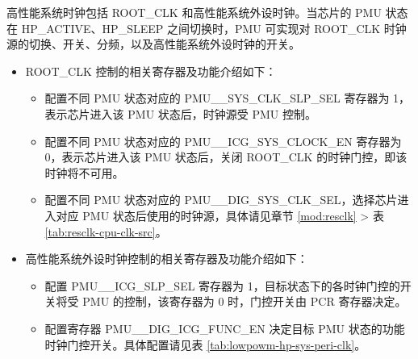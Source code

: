 \documentclass[main\_\_CN.tex]{subfiles}
\begin{document}
高性能系统时钟包括 ROOT\_CLK 和高性能系统外设时钟。当芯片的 PMU 状态在 HP\_ACTIVE、HP\_SLEEP 之间切换时，PMU 可实现对 ROOT\_CLK 时钟源的切换、开关、分频，以及高性能系统外设时钟的开关。

\begin{itemize}

\item ROOT\_CLK 控制的相关寄存器及功能介绍如下：

    \begin{itemize}
    \item 配置不同 PMU 状态对应的 PMU\_\_SYS\_CLK\_SLP\_SEL 寄存器为 1，表示芯片进入该 PMU 状态后，时钟源受 PMU 控制。

    \item 配置不同 PMU 状态对应的 PMU\_\_ICG\_SYS\_CLOCK\_EN 寄存器为 0，表示芯片进入该 PMU 状态后，关闭 ROOT\_CLK 的时钟门控，即该时钟将不可用。

    \item 配置不同 PMU 状态对应的 PMU\_\_DIG\_SYS\_CLK\_SEL，选择芯片进入对应 PMU 状态后使用的时钟源，具体请见章节 \ref{mod:resclk} \textit{} > 表 \ref{tab:resclk-cpu-clk-src}。
    \end{itemize}

\item 高性能系统外设时钟控制的相关寄存器及功能介绍如下：

    \begin{itemize}
    \item 配置 PMU\_\_ICG\_SLP\_SEL 寄存器为 1，目标状态下的各时钟门控的开关将受 PMU 的控制，该寄存器为 0 时，门控开关由 PCR 寄存器决定。

    \item 配置寄存器 PMU\_\_DIG\_ICG\_FUNC\_EN 决定目标 PMU 状态的功能时钟门控开关。具体配置请见表 \ref{tab:lowpowm-hp-sys-peri-clk}。
    \end{itemize}


\end{itemize}
\end{document}
